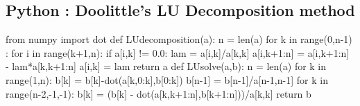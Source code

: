 \subsection{Python : Doolittle's LU Decomposition method}
\begin{program}
	\begin{python}
		from numpy import dot
		def LUdecomposition(a):
			n = len(a)
			for k in range(0,n-1) : 
				for i in range(k+1,n):
					if a[i,k] != 0.0:
						lam = a[i,k]/a[k,k]
						a[i,k+1:n] = a[i,k+1:n] - lam*a[k,k+1:n]
						a[i,k] = lam
			return a
		def LUsolve(a,b):
			n = len(a)
			for k in range(1,n):
				b[k] = b[k]-dot(a[k,0:k],b[0:k])
			b[n-1] = b[n-1]/a[n-1,n-1]
			for k in range(n-2,-1,-1):
				b[k] = (b[k] - dot(a[k,k+1:n],b[k+1:n]))/a[k,k]
			return b
	\end{python}
\end{program}

